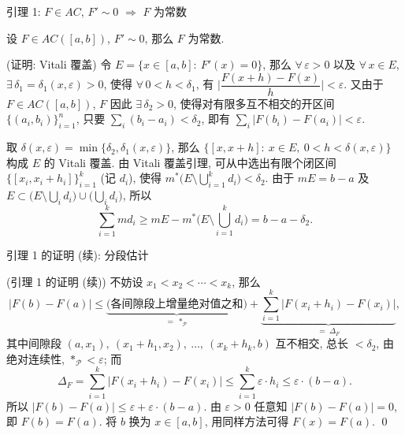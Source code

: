 
\begin{frame}{引理 1: $F \in AC$, $F' \sim 0$ $\Longrightarrow$ $F$ 为常数}

\begin{lem}
设 $F \in AC([a, b])$, $F' \sim 0$, 那么 $F$ 为常数.
\end{lem}

\startproof[bg=yellow, fg=red](证明: Vitali 覆盖)
令 $E = \{ x \in [a, b]:\ F'(x) = 0 \}$, 那么 $\forall\, \varepsilon > 0$ 以及
$\forall\, x \in E$, $\exists\, \delta_1 = \delta_1(x, \varepsilon) > 0$, 使得
$\forall\, 0 < h < \delta_1$, 有
$\Big| \dfrac{F(x+h) - F(x)}{h} \Big| < \varepsilon$.
又由于 $F \in AC([a, b])$, $F$ 因此 $\exists\, \delta_2 > 0$, 使得对有限多互不相交的开区间
$\{ (a_i, b_i) \}_{i=1}^n$, 只要 $\sum_i (b_i - a_i) < \delta_2$,
即有 $\sum_i |F(b_i) - F(a_i)| < \varepsilon$.

\pause

取 $\delta(x, \varepsilon) = \min \{ \delta_2, \delta_1(x, \varepsilon) \}$, 那么
$\{ [x, x + h]:\ x \in E,\ 0 < h < \delta(x, \varepsilon) \}$ 构成 $E$ 的 Vitali 覆盖.
由 Vitali 覆盖引理, 可从中选出有限个闭区间
$\{ [x_i, x_i + h_i] \}_{i=1}^{k}$ (记 $d_i$), 使得
$m^* \big( E \setminus \bigcup_{i=1}^{k} d_i \big) < \delta_2$.
由于 $mE = b - a$ 及 $E \subset \big( E \setminus \bigcup_i d_i \big) \cup \big( \bigcup_i d_i \big)$,
所以
\[
\sum_{i=1}^{k} m d_i
\geqslant mE - m^* \Big( E \setminus \bigcup_{i=1}^{k} d_i \Big)
= b - a - \delta_2 .
\]

\end{frame}


\begin{frame}{引理 1 的证明 (续): 分段估计}

\startproof[bg=yellow, fg=red](引理 1 的证明 (续))
不妨设 $x_1 < x_2 < \cdots < x_k$, 那么
\[
|F(b) - F(a)|
\leqslant \underbrace{\big( \text{各间隙段上增量绝对值之和} \big)}_{=\ *_{\mathscr{P}}}
+ \underbrace{\sum_{i=1}^{k} \big| F(x_i + h_i) - F(x_i) \big|}_{=\ \Delta_F} ,
\]
其中间隙段 $(a, x_1),\ (x_1 + h_1, x_2),\ \dots,\ (x_k + h_k, b)$ 互不相交,
总长 $< \delta_2$, 由绝对连续性, $*_{\mathscr{P}} < \varepsilon$; 而
\[
\Delta_F = \sum_{i=1}^{k} \big| F(x_i + h_i) - F(x_i) \big|
\leqslant \sum_{i=1}^{k} \varepsilon \cdot h_i
\leqslant \varepsilon \cdot (b - a) .
\]
所以 $|F(b) - F(a)| \leqslant \varepsilon + \varepsilon \cdot (b - a)$.
由 $\varepsilon > 0$ 任意知 $|F(b) - F(a)| = 0$, 即 $F(b) = F(a)$.
将 $b$ 换为 $x \in [a, b]$, 用同样方法可得 $F(x) = F(a)$.
\qed

\end{frame}

